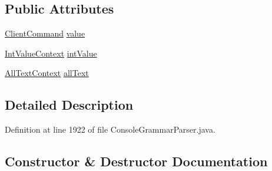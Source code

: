 \subsection*{Public Attributes}
\begin{DoxyCompactItemize}
\item 
\hyperlink{classgov_1_1nasa_1_1jpf_1_1inspector_1_1client_1_1_client_command}{Client\+Command} \hyperlink{classgov_1_1nasa_1_1jpf_1_1inspector_1_1client_1_1parser_1_1_console_grammar_parser_1_1_cmd_program_state_context_ac1826edf5b118a80bfefbbbf4ab0792b}{value}
\item 
\hyperlink{classgov_1_1nasa_1_1jpf_1_1inspector_1_1client_1_1parser_1_1_console_grammar_parser_1_1_int_value_context}{Int\+Value\+Context} \hyperlink{classgov_1_1nasa_1_1jpf_1_1inspector_1_1client_1_1parser_1_1_console_grammar_parser_1_1_cmd_program_state_context_a809f32fc3fdb98322943d1574c4bd90c}{int\+Value}
\item 
\hyperlink{classgov_1_1nasa_1_1jpf_1_1inspector_1_1client_1_1parser_1_1_console_grammar_parser_1_1_all_text_context}{All\+Text\+Context} \hyperlink{classgov_1_1nasa_1_1jpf_1_1inspector_1_1client_1_1parser_1_1_console_grammar_parser_1_1_cmd_program_state_context_a18be044aaafd91e2510e144d6b5f6274}{all\+Text}
\end{DoxyCompactItemize}


\subsection{Detailed Description}


Definition at line 1922 of file Console\+Grammar\+Parser.\+java.



\subsection{Constructor \& Destructor Documentation}
